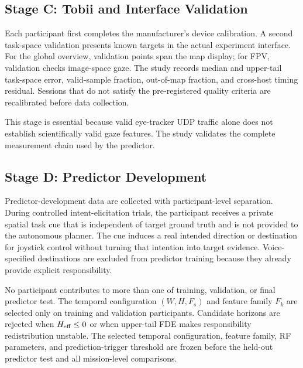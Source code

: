 \documentclass[conference]{IEEEtran}
\begin{document}
\subsection{Stage C: Tobii and Interface Validation}

Each participant first completes the manufacturer's device calibration. A
second task-space validation presents known targets in the actual experiment
interface. For the global overview, validation points span the map display;
for FPV, validation checks image-space gaze. The study records median and
upper-tail task-space error, valid-sample fraction, out-of-map fraction, and
cross-host timing residual. Sessions that do not satisfy the pre-registered
quality criteria are recalibrated before data collection.

This stage is essential because valid eye-tracker UDP traffic alone does not
establish scientifically valid gaze features. The study validates the complete
measurement chain used by the predictor.

\subsection{Stage D: Predictor Development}

Predictor-development data are collected with participant-level separation.
During controlled intent-elicitation trials, the participant receives a
private spatial task cue that is independent of target ground truth and is not
provided to the autonomous planner. The cue induces a real intended direction
or destination for joystick control without turning that intention into target
evidence. Voice-specified destinations are excluded from predictor training
because they already provide explicit responsibility.

No participant contributes to more than one of training, validation, or final
predictor test. The temporal configuration $(W,H,F_s)$ and feature family
$F_k$ are selected only on training and validation participants. Candidate
horizons are rejected when $H_{\rm eff}\le0$ or when upper-tail FDE makes
responsibility redistribution unstable. The selected temporal configuration,
feature family, RF parameters, and prediction-trigger threshold are frozen
before the held-out predictor test and all mission-level comparisons.
\end{document}
